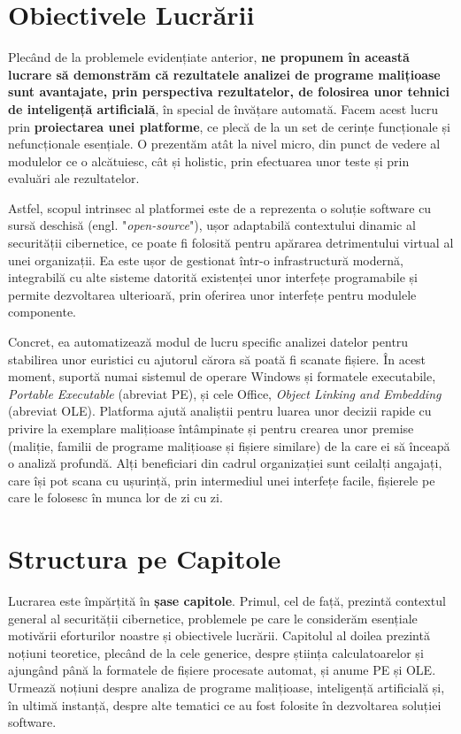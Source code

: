 \documentclass[../../main.tex]{subfiles}
\begin{document}
\section{Obiectivele Lucrării}
\label{sec:introduction_objectives}

Plecând de la problemele evidențiate anterior, \textbf{ne propunem în această lucrare să demonstrăm că rezultatele analizei de programe malițioase sunt avantajate, prin perspectiva rezultatelor, de folosirea unor teh\-nici de inteligență artificială}, în special de învățare automată. Facem acest lucru prin \textbf{proiectarea unei platforme}, ce plecă de la un set de cerințe funcționale și nefuncționale esențiale. O prezentăm atât la nivel micro, din punct de vedere al modulelor ce o alcătuiesc, cât și holistic, prin efectuarea unor teste și prin evaluări ale rezultatelor.

Astfel, scopul intrinsec al platformei este de a reprezenta o soluție software cu sursă deschisă (engl. "\textit{open-source}"), ușor adaptabilă contextului dinamic al securității cibernetice, ce poate fi folosită pentru apărarea detrimentului virtual al unei organizații. Ea este ușor de gestionat într-o infrastructură modernă, integrabilă cu alte sisteme datorită existenței unor interfețe programabile și permite dezvoltarea ulterioară, prin oferirea unor interfețe pentru modulele componente.

Concret, ea automatizează modul de lucru specific analizei datelor pentru stabilirea unor euristici cu ajutorul cărora să poată fi scanate fișiere. În acest moment, suportă numai sistemul de operare Windows și formatele executabile, \textit{Portable Executable} (abreviat PE), și cele Office, \textit{Object Linking and Embedding} (abreviat OLE). Platforma ajută analiștii pentru luarea unor decizii rapide cu privire la exemplare malițioase întâmpinate și pentru crearea unor premise (maliție, familii de programe malițioase și fișiere similare) de la care ei să înceapă o analiză profundă. Alți beneficiari din cadrul organizației sunt ceilalți angajați, care își pot scana cu ușurință, prin intermediul unei interfețe facile, fișierele pe care le folosesc în munca lor de zi cu zi.

\section{Structura pe Capitole}
\label{sec:introduction_chapters}

Lucrarea este împărțită în \textbf{șase capitole}. Primul, cel de față, prezintă contextul general al securității cibernetice, problemele pe care le considerăm esențiale motivării eforturilor noastre și obiectivele lucrării. Capitolul al doilea prezintă noțiuni teoretice, plecând de la cele generice, despre știința calculatoarelor și ajungând până la formatele de fișiere procesate automat, și anume PE și OLE. Urmează noțiuni despre analiza de programe malițioase, inteligență artificială și, în ultimă instanță, despre alte tematici ce au fost folosite în dezvoltarea soluției software.
\end{document}
